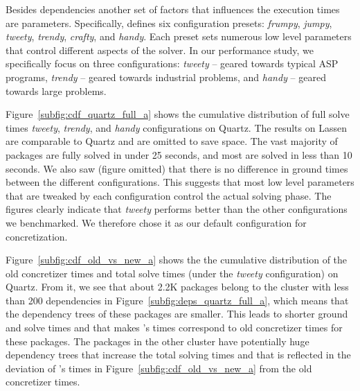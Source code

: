 

% 

% 

% 

Besides dependencies another set of factors that influences the execution times are
\clingo{} parameters. Specifically, \clingo{} defines six configuration presets:
\emph{frumpy}, \emph{jumpy}, \emph{tweety}, \emph{trendy}, \emph{crafty}, and
\emph{handy}. Each preset sets numerous low level parameters that control different
aspects of the solver. In our performance study, we specifically focus on three
configurations: \emph{tweety} -- geared towards typical ASP programs, \emph{trendy} --
geared towards industrial problems, and \emph{handy} -- geared towards large problems.

Figure~\ref{subfig:cdf_quartz_full_a} shows the cumulative distribution of full solve
times \emph{tweety}, \emph{trendy}, and \emph{handy} configurations on Quartz. The
results on Lassen are comparable to Quartz and are omitted to save space. The vast
majority of packages are fully solved in under 25 seconds, and most are solved in less
than 10 seconds. We also saw (figure omitted) that there is no difference in ground
times between the different configurations. This suggests that most low level parameters
that are tweaked by each configuration control the actual solving phase. The figures
clearly indicate that \emph{tweety} performs better than the other configurations we
benchmarked. We therefore chose it as our default configuration for concretization.

Figure~\ref{subfig:cdf_old_vs_new_a} shows the the cumulative distribution of the old
concretizer times and \clingo{} total solve times (under the \emph{tweety}
configuration) on Quartz. From it, we see that about 2.2K packages
belong to the cluster with less than 200 dependencies in
Figure~\ref{subfig:deps_quartz_full_a}, which means that the dependency trees of these
packages are smaller. This leads to shorter ground and solve times and that makes
\clingo{}'s times correspond to old concretizer times for these packages. The packages
in the other cluster have potentially huge dependency trees that increase the total
solving times and that is reflected in the deviation of \clingo{}'s times in
Figure~\ref{subfig:cdf_old_vs_new_a} from the old concretizer times.

